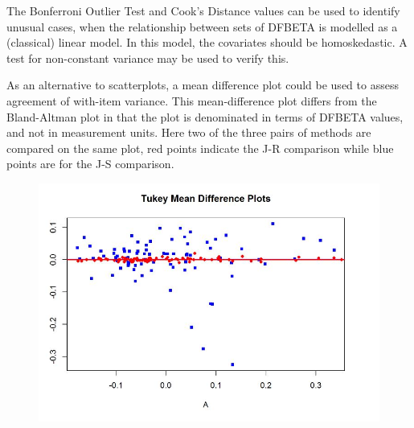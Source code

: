 \documentclass[12pt, a4paper]{report}
\theoremstyle{plain}
\theoremstyle{definition}
\theoremstyle{remark}
\begin{document}

The Bonferroni Outlier Test and Cook's Distance values can be used to identify unusual cases, when the relationship between sets of DFBETA is modelled as a (classical) linear model. In this model, the covariates should be homoskedastic. A test for non-constant variance may be used to verify this. 


As an alternative to scatterplots, a mean difference plot could be used to assess agreement of with-item variance. This mean-difference plot differs from the Bland-Altman plot in that the plot is denominated in terms of DFBETA values, and not in measurement units. Here two of the three pairs of methods are compared on the same plot, red points indicate the J-R comparison while blue points are for the J-S comparison.

\begin{figure}[h!
	]
	\centering
	\includegraphics[width=0.7\linewidth]{images/04-TMDplot}
	
\end{figure}



\end{document}
